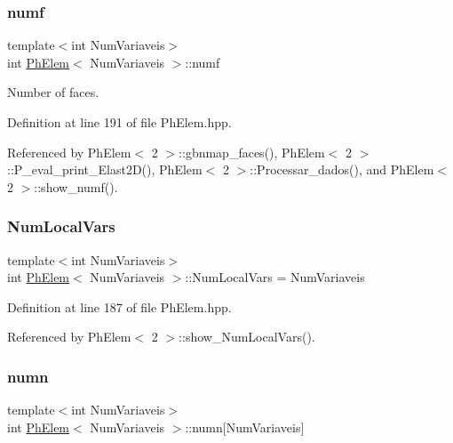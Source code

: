 \mbox{\label{classPhElem_a85d9a8342adf9e155a533edf165a6fe3}} 
\subsubsection{\texorpdfstring{numf}{numf}}
{\footnotesize\ttfamily template$<$int Num\+Variaveis$>$ \\
int \hyperlink{classPhElem}{Ph\+Elem}$<$ Num\+Variaveis $>$\+::numf\hspace{0.3cm}{\ttfamily [protected]}}



Number of faces. 



Definition at line 191 of file Ph\+Elem.\+hpp.



Referenced by Ph\+Elem$<$ 2 $>$\+::gbnmap\+\_\+faces(), Ph\+Elem$<$ 2 $>$\+::\+P\+\_\+eval\+\_\+print\+\_\+\+Elast2\+D(), Ph\+Elem$<$ 2 $>$\+::\+Processar\+\_\+dados(), and Ph\+Elem$<$ 2 $>$\+::show\+\_\+numf().

\mbox{\label{classPhElem_a2ec71d768628a94d7fbe74be08a08ea9}} 
\subsubsection{\texorpdfstring{Num\+Local\+Vars}{NumLocalVars}}
{\footnotesize\ttfamily template$<$int Num\+Variaveis$>$ \\
int \hyperlink{classPhElem}{Ph\+Elem}$<$ Num\+Variaveis $>$\+::Num\+Local\+Vars = Num\+Variaveis\hspace{0.3cm}{\ttfamily [protected]}}



Definition at line 187 of file Ph\+Elem.\+hpp.



Referenced by Ph\+Elem$<$ 2 $>$\+::show\+\_\+\+Num\+Local\+Vars().

\mbox{\label{classPhElem_a8e65fa4998d28b9b8db9b6fcf8999d20}} 
\subsubsection{\texorpdfstring{numn}{numn}}
{\footnotesize\ttfamily template$<$int Num\+Variaveis$>$ \\
int \hyperlink{classPhElem}{Ph\+Elem}$<$ Num\+Variaveis $>$\+::numn\mbox{[}Num\+Variaveis\mbox{]}\hspace{0.3cm}{\ttfamily [protected]}}



